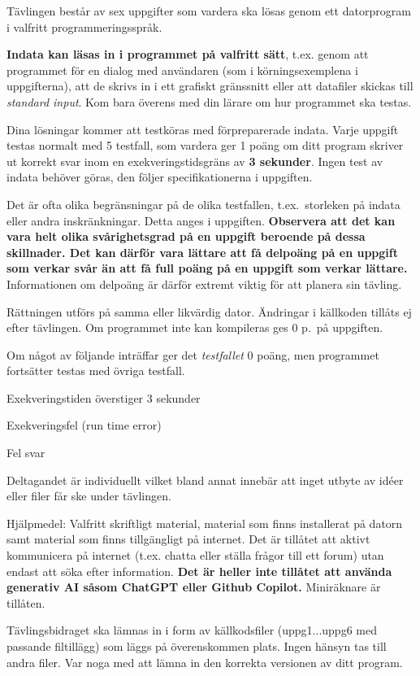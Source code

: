 {\begin{lista}
\item Tävlingen består av sex uppgifter som vardera ska lösas genom ett
  datorprogram i valfritt programmeringsspråk.
\item {\bf Indata kan läsas in i programmet på valfritt sätt}, t.ex. genom att programmet för en dialog med användaren (som i körningsexemplena i uppgifterna), att de skrivs in i ett grafiskt gränssnitt eller att datafiler skickas till {\em standard input}. Kom bara överens med din lärare om hur programmet ska testas.
\item Dina lösningar kommer att testköras med förpreparerade
  indata. Varje uppgift testas normalt med 5 testfall, som vardera ger
  1 poäng om ditt program skriver ut korrekt svar inom en exekveringstidsgräns av
  {\bf 3 sekunder}. Ingen test av indata behöver göras, den följer specifikationerna 
i uppgiften.
\item Det är ofta olika begränsningar på de olika testfallen, t.ex.\ storleken på
indata eller andra inskränkningar. Detta anges i uppgiften. {\bf Observera att det kan vara
helt olika svårighetsgrad på en uppgift beroende på dessa skillnader. Det kan därför vara
lättare att få delpoäng på en uppgift som verkar svår än att få full
poäng på en uppgift som verkar lättare.} Informationen om delpoäng är
därför extremt viktig för att planera sin
tävling.
\item Rättningen utförs på samma eller likvärdig dator. Ändringar
  i källkoden tillåts ej efter tävlingen. Om programmet
  inte kan kompileras ges 0 p.\ på uppgiften. 
\item Om något av följande inträffar ger
  det {\em testfallet} 0 poäng, men programmet fortsätter testas med övriga testfall.
\begin{lista}
\item Exekveringstiden överstiger 3 sekunder \vspace{-0.2cm}
\item Exekveringsfel (run time error) \vspace{-0.2cm}
\item Fel svar \vspace{-0.2cm}
\end{lista}

\item Deltagandet är individuellt vilket bland annat innebär att inget utbyte av idéer eller 
filer får ske under tävlingen.  
\item Hjälpmedel: Valfritt skriftligt material, material som finns installerat på datorn samt material som finns tillgängligt på internet.
Det är  tillåtet att aktivt kommunicera på internet (t.ex. chatta eller ställa frågor till ett forum) utan endast att söka efter information.
{\bf Det är heller inte tillåtet att använda generativ AI såsom ChatGPT eller Github Copilot.}
Miniräknare är tillåten.
\item Tävlingsbidraget ska lämnas in i form av källkodsfiler (uppg1...uppg6 med passande filtillägg) som läggs på överenskommen plats. Ingen hänsyn tas till andra filer. Var noga 
med att lämna in den korrekta versionen av ditt program.  
\end{lista}
}
